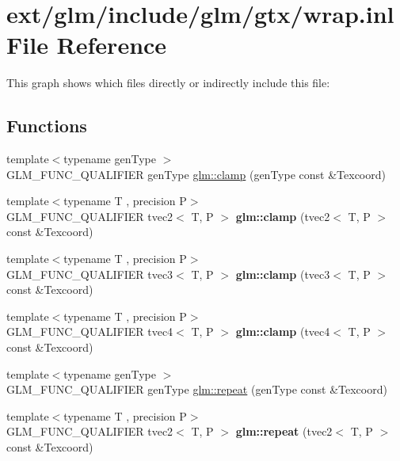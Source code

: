 \hypertarget{wrap_8inl}{\section{ext/glm/include/glm/gtx/wrap.inl File Reference}
\label{wrap_8inl}
}
This graph shows which files directly or indirectly include this file\-:
\subsection*{Functions}
\begin{DoxyCompactItemize}
\item 
{\footnotesize template$<$typename gen\-Type $>$ }\\G\-L\-M\-\_\-\-F\-U\-N\-C\-\_\-\-Q\-U\-A\-L\-I\-F\-I\-E\-R gen\-Type \hyperlink{group__gtx__wrap_ga6c0cc6bd1d67ea1008d2592e998bad33}{glm\-::clamp} (gen\-Type const \&Texcoord)
\item 
\hypertarget{namespaceglm_a44107199d20102cbd6c9b64f72cfba55}{{\footnotesize template$<$typename T , precision P$>$ }\\G\-L\-M\-\_\-\-F\-U\-N\-C\-\_\-\-Q\-U\-A\-L\-I\-F\-I\-E\-R tvec2$<$ T, P $>$ {\bfseries glm\-::clamp} (tvec2$<$ T, P $>$ const \&Texcoord)}\label{namespaceglm_a44107199d20102cbd6c9b64f72cfba55}

\item 
\hypertarget{namespaceglm_a020c0df6915c1ede86ffbd807a5b47c1}{{\footnotesize template$<$typename T , precision P$>$ }\\G\-L\-M\-\_\-\-F\-U\-N\-C\-\_\-\-Q\-U\-A\-L\-I\-F\-I\-E\-R tvec3$<$ T, P $>$ {\bfseries glm\-::clamp} (tvec3$<$ T, P $>$ const \&Texcoord)}\label{namespaceglm_a020c0df6915c1ede86ffbd807a5b47c1}

\item 
\hypertarget{namespaceglm_a42bda64124cb7e94d86c1edb6025a932}{{\footnotesize template$<$typename T , precision P$>$ }\\G\-L\-M\-\_\-\-F\-U\-N\-C\-\_\-\-Q\-U\-A\-L\-I\-F\-I\-E\-R tvec4$<$ T, P $>$ {\bfseries glm\-::clamp} (tvec4$<$ T, P $>$ const \&Texcoord)}\label{namespaceglm_a42bda64124cb7e94d86c1edb6025a932}

\item 
{\footnotesize template$<$typename gen\-Type $>$ }\\G\-L\-M\-\_\-\-F\-U\-N\-C\-\_\-\-Q\-U\-A\-L\-I\-F\-I\-E\-R gen\-Type \hyperlink{group__gtx__wrap_ga809650c6310ea7c42666e918c117fb6f}{glm\-::repeat} (gen\-Type const \&Texcoord)
\item 
\hypertarget{namespaceglm_a3f9751f6712e70e7bee9e86edaa23dc3}{{\footnotesize template$<$typename T , precision P$>$ }\\G\-L\-M\-\_\-\-F\-U\-N\-C\-\_\-\-Q\-U\-A\-L\-I\-F\-I\-E\-R tvec2$<$ T, P $>$ {\bfseries glm\-::repeat} (tvec2$<$ T, P $>$ const \&Texcoord)}\label{namespaceglm_a3f9751f6712e70e7bee9e86edaa23dc3}


\end{DoxyCompactItemize}
